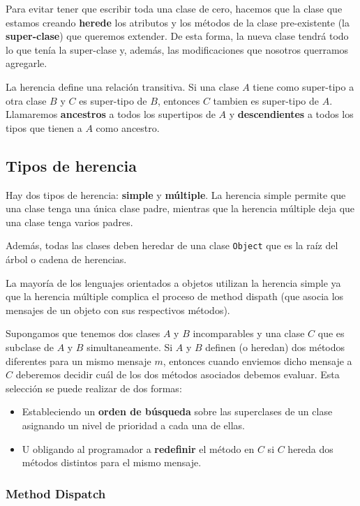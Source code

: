 Para evitar tener que escribir toda una clase de cero, hacemos que la clase que estamos creando \textbf{herede} los atributos y los métodos de la clase pre-existente (la \textbf{super-clase}) que queremos extender. De esta forma, la nueva clase tendrá todo lo que tenía la super-clase y, además, las modificaciones que nosotros querramos agregarle.

La herencia define una relación transitiva. Si una clase $A$ tiene como super-tipo a otra clase $B$ y $C$ es super-tipo de $B$, entonces $C$ tambien es super-tipo de $A$. Llamaremos \textbf{ancestros} a todos los supertipos de $A$ y \textbf{descendientes} a todos los tipos que tienen a $A$ como ancestro.

\subsection{Tipos de herencia}
Hay dos tipos de herencia: \textbf{simple} y \textbf{múltiple}. La herencia simple permite que una clase tenga una única clase padre, mientras que la herencia múltiple deja que una clase tenga varios padres.

Además, todas las clases deben heredar de una clase \texttt{Object} que es la raíz del árbol o cadena de herencias.

La mayoría de los lenguajes orientados a objetos utilizan la herencia simple ya que la herencia múltiple complica el proceso de method dispath (que asocia los mensajes de un objeto con sus respectivos métodos). 

Supongamos que tenemos dos clases $A$ y $B$ incomparables y una clase $C$ que es subclase de $A$ y $B$ simultaneamente. Si $A$ y $B$ definen (o heredan) dos métodos diferentes para un mismo mensaje $m$, entonces cuando enviemos dicho mensaje a $C$ deberemos decidir cuál de los dos métodos asociados debemos evaluar. Esta selección se puede realizar de dos formas:
\begin{itemize}
\item Estableciendo un \textbf{orden de búsqueda} sobre las superclases de un clase asignando un nivel de prioridad a cada una de ellas.
\item U obligando al programador a \textbf{redefinir} el método en $C$ si $C$ hereda dos métodos distintos para el mismo mensaje.
\end{itemize}

\subsubsection{Method Dispatch}

